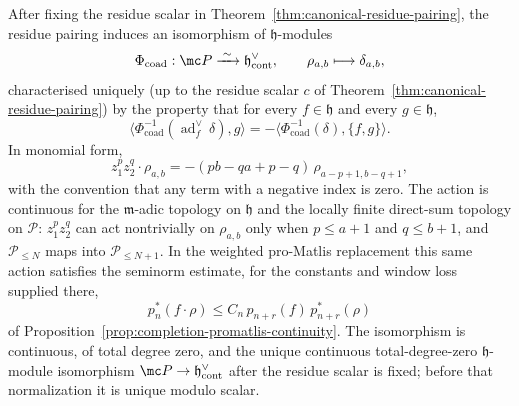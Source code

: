 \documentclass[11pt]{memoir}
\begin{document}
\begin{thm}\label{thm:principal-part-coadjoint-uniqueness}
  After fixing the residue scalar in
  Theorem~\ref{thm:canonical-residue-pairing}, the residue pairing induces
  an isomorphism of $\mathfrak h$-modules
  $$\Phi_{\mathrm{coad}}:\mc P\xrightarrow{\;\sim\;}
    \mathfrak h^\vee_{\mathrm{cont}},\qquad
    \rho_{a,b}\longmapsto\delta_{a,b},$$
  characterised uniquely (up to the residue scalar $c$ of
  Theorem~\ref{thm:canonical-residue-pairing}) by the property that for
  every $f\in\mathfrak h$ and every $g\in\mathfrak h$,
  $$\langle\Phi_{\mathrm{coad}}^{-1}(\operatorname{ad}^{\vee}_f\,\delta),g\rangle
   =-\langle\Phi_{\mathrm{coad}}^{-1}(\delta),\{f,g\}\rangle.$$
  In monomial form,
  $$z_1^pz_2^q\cdot\rho_{a,b}
    =-(pb-qa+p-q)\,\rho_{a-p+1,b-q+1},$$
  with the convention that any term with a negative index is zero. The
  action is continuous for the \(\mathfrak m\)-adic topology on
  \(\mathfrak h\) and the locally finite direct-sum topology on
  \(\mathcal P\): \(z_1^pz_2^q\) can act nontrivially on
  \(\rho_{a,b}\) only when \(p\leq a+1\) and \(q\leq b+1\), and
  \(\mathcal P_{\leq N}\) maps into \(\mathcal P_{\leq N+1}\).  In the
  weighted pro-Matlis replacement this same action satisfies the
  seminorm estimate, for the constants and window loss supplied there,
  \[
    p^*_n(f\cdot\rho)\le C_n\,p_{n+r}(f)\,p^*_{n+r}(\rho)
  \]
  of Proposition~\ref{prop:completion-promatlis-continuity}.  The
  isomorphism is continuous, of total degree zero, and the unique
  continuous total-degree-zero $\mathfrak h$-module isomorphism
  $\mc P\to\mathfrak h^\vee_{\mathrm{cont}}$ after the residue scalar is
  fixed; before that normalization it is unique modulo scalar.
\end{thm}
\end{document}
